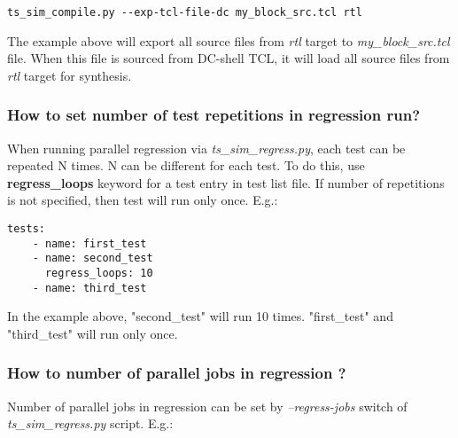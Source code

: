 \documentclass{tropic_design_spec}
\begin{document}
\begin{lstlisting}
ts_sim_compile.py --exp-tcl-file-dc my_block_src.tcl rtl
\end{lstlisting}

The example above will export all source files from \textit{rtl} target to \textit{my_block_src.tcl}
file. When this file is sourced from DC-shell TCL, it will load all source files from \textit{rtl}
target for synthesis.



\subsubsection{How to set number of test repetitions in regression run?}
\label{sec:how-to-set-number-of-repetitions-in-regression-run}

When running parallel regression via \textit{ts_sim_regress.py}, each test can be
repeated N times. N can be different for each test. To do this, use \textbf{regress_loops}
keyword for a test entry in test list file. If number of repetitions is not specified,
then test will run only once. E.g.:

\begin{lstlisting}
tests:
    - name: first_test
    - name: second_test
      regress_loops: 10
    - name: third_test
\end{lstlisting}

In the example above, "second_test" will run 10 times. "first_test" and "third_test" will
run only once.



\subsubsection{How to number of parallel jobs in regression ?}
\label{sec:how-to-set-number-of-parallel-jobs-in-regression}

Number of parallel jobs in regression can be set by \textit{--regress-jobs} switch of
\textit{ts_sim_regress.py} script. E.g.:
\end{document}
